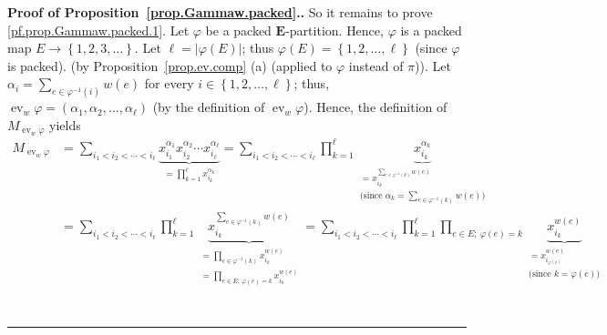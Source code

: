 \documentclass[numbers=enddot,12pt,final,onecolumn,notitlepage,abstracton]{scrartcl}
\theoremstyle{definition}
\newenvironment{proof}[1][Proof]{\noindent\textbf{#1.} }{\ \rule{0.5em}{0.5em}}
\let\sumnonlimits\sum
\let\prodnonlimits\prod
\renewcommand{\sum}{\sumnonlimits\limits}
\renewcommand{\prod}{\prodnonlimits\limits}
\newenvironment{verlong}{}{}
\newenvironment{vershort}{}{}
\newcommand{\ev}{\operatorname{ev}}
\newcommand{\EE}{{\mathbf{E}}}
\begin{document}
\begin{proof}[Proof of Proposition~\ref{prop.Gammaw.packed}.]
So it remains to prove \eqref{pf.prop.Gammaw.packed.1}. Let $\varphi$
be a packed $\EE$-partition.
\begin{verlong}
Hence, $\varphi$ is a packed map
$E \to \left\{ 1, 2, 3, \ldots \right\}$.
\end{verlong}
Let
$\ell = \left|\varphi\left(E\right)\right|$; thus
$\varphi\left(E\right) = \left\{1, 2, \ldots, \ell\right\}$
\begin{vershort}
(since $\varphi$ is packed).
\end{vershort}
\begin{verlong}
(by Proposition~\ref{prop.ev.comp} (a) (applied to $\varphi$
instead of $\pi$)).
\end{verlong}
Let $\alpha_i = \sum_{e \in \varphi^{-1}\left(i\right)}
w\left(e\right)$ for every $i \in \left\{ 1, 2, \ldots, \ell \right\}$;
thus,
$\ev_w \varphi = \left(\alpha_1, \alpha_2, \ldots, \alpha_\ell\right)$
(by the definition of $\ev_w \varphi$).
Hence, the definition of $M_{\ev_w \varphi}$ yields
\begin{align}
M_{\ev_w \varphi}
&= \sum_{i_1 < i_2 < \cdots < i_\ell}
\underbrace{x_{i_1}^{\alpha_1} x_{i_2}^{\alpha_2} \cdots x_{i_\ell}^{\alpha_\ell}}
_{= \prod_{k = 1}^\ell x_{i_k}^{\alpha_k}}
= \sum_{i_1 < i_2 < \cdots < i_\ell}
\prod_{k = 1}^\ell \underbrace{x_{i_k}^{\alpha_k}}
                              _{\substack{= x_{i_k}^{\sum_{e \in \varphi^{-1}\left(k\right)}
                                w\left(e\right)} \\
                                \text{(since } \alpha_k = \sum_{e \in \varphi^{-1}\left(k\right)}
                                w\left(e\right) \text{)}}}
\nonumber \\
&= \sum_{i_1 < i_2 < \cdots < i_\ell}
\prod_{k = 1}^\ell \underbrace{x_{i_k}^{\sum_{e \in \varphi^{-1}\left(k\right)}
                                w\left(e\right)}}
                              _{\substack{= \prod_{e \in \varphi^{-1}\left(k\right)}
                                x_{i_k}^{w\left(e\right)} \\
                                = \prod_{e \in E;\ \varphi\left(e\right) = k}
                                x_{i_k}^{w\left(e\right)} }}
= \sum_{i_1 < i_2 < \cdots < i_\ell}
\prod_{k = 1}^\ell \prod_{e \in E;\ \varphi\left(e\right) = k}
\underbrace{x_{i_k}^{w\left(e\right)}}_{\substack{
         =x_{i_{\varphi\left(e\right)}}^{w\left(e\right)} \\
         \text{(since } k = \varphi\left(e\right) \text{)}
         }}
\nonumber \\

\end{align}
\end{proof}
\end{document}
